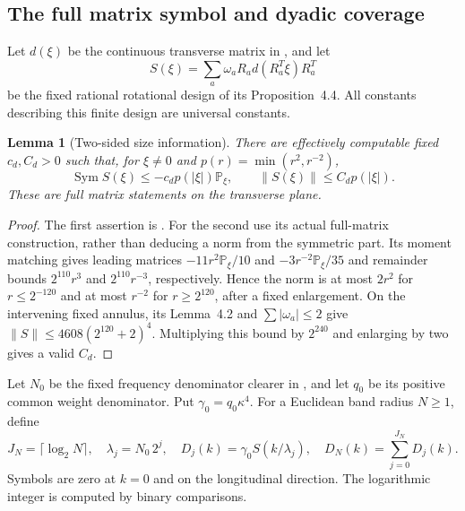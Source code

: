 \documentclass[11pt,a4paper]{amsart}
\newtheorem{lemma}[theorem]{Lemma}
\theoremstyle{definition}
\theoremstyle{remark}
\numberwithin{equation}{section}
\newcommand{\PP}{\mathbb P}
\newcommand{\norm}[1]{\lVert #1\rVert}
\begin{document}
\subsection{The full matrix symbol and dyadic coverage}
Let $d(\xi)$ be the continuous transverse matrix in
\cite[Section~4]{Common}, and let
\[
 S(\xi)=\sum_a\omega_aR_ad(R_a^T\xi)R_a^T
\]
be the fixed rational rotational design of its Proposition~4.4.
All constants describing this finite design are universal constants.

\begin{lemma}[Two-sided size information]\label{lem:amp-symbol}
There are effectively computable fixed $c_d,C_d>0$ such that, for
$\xi\ne0$ and $p(r)=\min(r^2,r^{-2})$,
\begin{equation}\label{eq:amp-symbol}
 \operatorname{Sym}S(\xi)\le-c_dp(|\xi|)\PP_\xi,\qquad
 \norm{S(\xi)}\le C_dp(|\xi|).
\end{equation}
These are full matrix statements on the transverse plane.
\end{lemma}
\begin{proof}
The first assertion is \cite[Proposition~4.4]{Common}.
For the second use its actual full-matrix construction, rather than
deducing a norm from the symmetric part.  Its moment matching gives leading
matrices $-11r^2\PP_\xi/10$ and $-3r^{-2}\PP_\xi/35$ and remainder
bounds $2^{110}r^3$ and $2^{110}r^{-3}$, respectively.  Hence the norm is
at most $2r^2$ for $r\le2^{-120}$ and at most $r^{-2}$ for
$r\ge2^{120}$, after a fixed enlargement.
On the intervening fixed annulus, its Lemma~4.2 and
$\sum|\omega_a|\le2$ give
$\norm S\le4608(2^{120}+2)^4$.  Multiplying this bound by $2^{240}$
and enlarging by two gives a valid $C_d$.
\end{proof}

Let $N_0$ be the fixed frequency denominator clearer in \cite{Common},
and let $q_0$ be its positive common weight denominator.  Put
$\gamma_0=q_0\kappa^4$.  For a Euclidean band radius $N\ge1$, define
\begin{equation}\label{eq:amp-dyadic}
 J_N=\lceil\log_2N\rceil,\quad
 \lambda_j=N_0\,2^j,\quad
 D_j(k)=\gamma_0S(k/\lambda_j),\quad
 D_N(k)=\sum_{j=0}^{J_N}D_j(k).
\end{equation}
Symbols are zero at $k=0$ and on the longitudinal direction.
The logarithmic integer is computed by binary comparisons.
\end{document}
